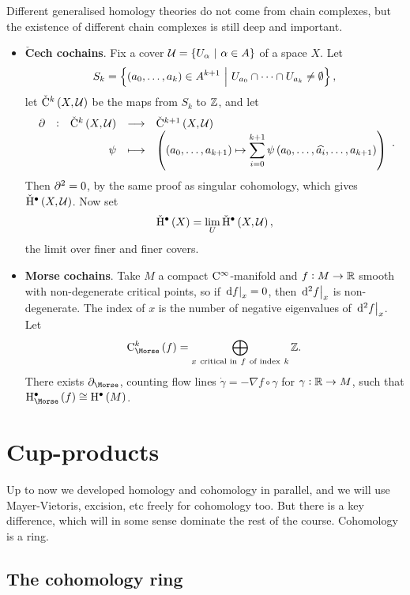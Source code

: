 \begin{remark*}
Different generalised homology theories do not come from chain complexes, but the existence of different chain complexes is still deep and important.
\begin{itemize}
\item \textbf{$\check{\mathbf{C}}$ech cochains}. Fix a cover $ \UUU = \cbr{U_\alpha \st \alpha \in A} $ of a space $ X $. Let
$$ S_k = \cbr{\br{a_0, \dots, a_k} \in A^{k + 1} \st U_{a_0} \cap \dots \cap U_{a_k} \ne \emptyset}, $$
let $ \vC^k\br{X, \UUU} $ be the maps from $ S_k $ to $ \mathbb{Z} $, and let
$$ \function[\da]{\vC^k\br{X, \UUU}}{\vC^{k + 1}\br{X, \UUU}}{\psi}{\br{\br{a_0, \dots, a_{k + 1}} \mapsto \displaystyle\sum_{i = 0}^{k + 1} \psi\br{a_0, \dots, \widehat{a_i}, \dots, a_{k + 1}}}}. $$
Then $ \partial^2 = 0 $, by the same proof as singular cohomology, which gives $ \vH^\bullet\br{X, \UUU} $. Now set
$$ \vH^\bullet\br{X} = \lim_U \vH^\bullet\br{X, \UUU}, $$
the limit over finer and finer covers.
\item \textbf{Morse cochains}. Take $ M $ a compact $ \mathrm{C}^\infty $-manifold and $ f : M \to \mathbb{R} $ smooth with non-degenerate critical points, so if $ \left. \mathrm{d} f \right|_x = 0 $, then $ \left. \mathrm{d}^2f \right|_x $ is non-degenerate. The index of $ x $ is the number of negative eigenvalues of $ \left. \mathrm{d}^2f \right|_x $. Let
$$ \C_{\Morse}^k\br{f} = \bigoplus_{x \ \text{critical in} \ f \ \text{of index} \ k} \ZZ. $$
There exists $ \da_{\Morse} $, counting flow lines $ \dot{\gamma} = -\nabla f \circ \gamma $ for $ \gamma : \mathbb{R} \to M $, such that $ \H_{\Morse}^\bullet\br{f} \cong \H^\bullet\br{M} $.
\end{itemize}
\end{remark*}

\pagebreak

\section{Cup-products}


Up to now we developed homology and cohomology in parallel, and we will use Mayer-Vietoris, excision, etc freely for cohomology too. But there is a key difference, which will in some sense dominate the rest of the course. Cohomology is a ring.

\subsection{The cohomology ring}

